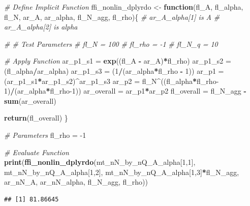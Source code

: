 \documentclass[
]{book}
\newenvironment{Shaded}{\begin{snugshade}}{\end{snugshade}}
\newcommand{\CommentTok}[1]{\textcolor[rgb]{0.56,0.35,0.01}{\textit{#1}}}
\newcommand{\ControlFlowTok}[1]{\textcolor[rgb]{0.13,0.29,0.53}{\textbf{#1}}}
\newcommand{\DecValTok}[1]{\textcolor[rgb]{0.00,0.00,0.81}{#1}}
\newcommand{\KeywordTok}[1]{\textcolor[rgb]{0.13,0.29,0.53}{\textbf{#1}}}
\newcommand{\NormalTok}[1]{#1}
\newcommand{\OperatorTok}[1]{\textcolor[rgb]{0.81,0.36,0.00}{\textbf{#1}}}
\newcommand{\StringTok}[1]{\textcolor[rgb]{0.31,0.60,0.02}{#1}}
\begin{document}
\begin{Shaded}
\begin{Highlighting}[]
\CommentTok{# Define Implicit Function}
\NormalTok{ffi_nonlin_dplyrdo <-}\StringTok{ }\ControlFlowTok{function}\NormalTok{(fl_A, fl_alpha, fl_N, ar_A, ar_alpha, fl_N_agg, fl_rho)\{}
  \CommentTok{# ar_A_alpha[1] is A}
  \CommentTok{# ar_A_alpha[2] is alpha}

  \CommentTok{# # Test Parameters}
  \CommentTok{# fl_N = 100}
  \CommentTok{# fl_rho = -1}
  \CommentTok{# fl_N_q = 10}

  \CommentTok{# Apply Function}
\NormalTok{  ar_p1_s1 =}\StringTok{ }\KeywordTok{exp}\NormalTok{((fl_A }\OperatorTok{-}\StringTok{ }\NormalTok{ar_A)}\OperatorTok{*}\NormalTok{fl_rho)}
\NormalTok{  ar_p1_s2 =}\StringTok{ }\NormalTok{(fl_alpha}\OperatorTok{/}\NormalTok{ar_alpha)}
\NormalTok{  ar_p1_s3 =}\StringTok{ }\NormalTok{(}\DecValTok{1}\OperatorTok{/}\NormalTok{(ar_alpha}\OperatorTok{*}\NormalTok{fl_rho }\OperatorTok{-}\StringTok{ }\DecValTok{1}\NormalTok{))}
\NormalTok{  ar_p1 =}\StringTok{ }\NormalTok{(ar_p1_s1}\OperatorTok{*}\NormalTok{ar_p1_s2)}\OperatorTok{^}\NormalTok{ar_p1_s3}
\NormalTok{  ar_p2 =}\StringTok{ }\NormalTok{fl_N}\OperatorTok{^}\NormalTok{((fl_alpha}\OperatorTok{*}\NormalTok{fl_rho}\DecValTok{-1}\NormalTok{)}\OperatorTok{/}\NormalTok{(ar_alpha}\OperatorTok{*}\NormalTok{fl_rho}\DecValTok{-1}\NormalTok{))}
\NormalTok{  ar_overall =}\StringTok{ }\NormalTok{ar_p1}\OperatorTok{*}\NormalTok{ar_p2}
\NormalTok{  fl_overall =}\StringTok{ }\NormalTok{fl_N_agg }\OperatorTok{-}\StringTok{ }\KeywordTok{sum}\NormalTok{(ar_overall)}

  \KeywordTok{return}\NormalTok{(fl_overall)}
\NormalTok{\}}

\CommentTok{# Parameters}
\NormalTok{fl_rho =}\StringTok{ }\DecValTok{-1}

\CommentTok{# Evaluate Function}
\KeywordTok{print}\NormalTok{(}\KeywordTok{ffi_nonlin_dplyrdo}\NormalTok{(mt_nN_by_nQ_A_alpha[}\DecValTok{1}\NormalTok{,}\DecValTok{1}\NormalTok{],}
\NormalTok{                         mt_nN_by_nQ_A_alpha[}\DecValTok{1}\NormalTok{,}\DecValTok{2}\NormalTok{],}
\NormalTok{                         mt_nN_by_nQ_A_alpha[}\DecValTok{1}\NormalTok{,}\DecValTok{3}\NormalTok{]}\OperatorTok{*}\NormalTok{fl_N_agg,}
\NormalTok{                         ar_nN_A, ar_nN_alpha, fl_N_agg, fl_rho))}
\end{Highlighting}
\end{Shaded}

\begin{verbatim}
## [1] 81.86645
\end{verbatim}
\end{document}
